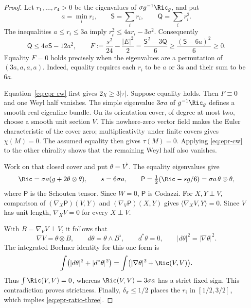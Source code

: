 \begin{proof}
Let $r_1,\ldots,r_4>0$ be the eigenvalues of
$\sigma g^{-1}\Ric_g$, and put
\[
 a=\min_i r_i,\qquad \mathsf S=\sum_i r_i,
 \qquad \mathsf Q=\sum_i r_i^2.
\]
The inequalities $a\leq r_i\leq3a$ imply
$r_i^2\leq4ar_i-3a^2$.  Consequently
\begin{equation}\label{eq:epr-density-endpoint}
 \mathsf Q\leq4a\mathsf S-12a^2,\qquad
 F:=\frac{s^2}{24}-\frac{|E|^2}{2}
 =\frac{\mathsf S^2-3\mathsf Q}{6}
 \geq\frac{(\mathsf S-6a)^2}{6}\geq0.
\end{equation}
Equality $F=0$ holds precisely when the eigenvalues are a permutation
of $(3a,a,a,a)$.  Indeed, equality requires each $r_i$ to be $a$ or
$3a$ and their sum to be $6a$.

Equation~\eqref{eq:epr-cw} first gives $2\chi\geq3|\tau|$.
Suppose equality holds.  Then $F\equiv0$ and one Weyl half vanishes.
The simple eigenvalue $3\sigma a$ of $g^{-1}\Ric_g$ defines a smooth
real eigenline bundle.  On its orientation cover, of degree at most
two, choose a smooth unit section $V$.  This nowhere-zero vector
field makes the Euler characteristic of the cover zero; multiplicativity
under finite covers gives $\chi(M)=0$.  The assumed equality then
gives $\tau(M)=0$.  Applying \eqref{eq:epr-cw} to the other chirality
shows that the remaining Weyl half also vanishes.

Work on that closed cover and put $\theta=V^\flat$.  The equality
eigenvalues give
\[
 \Ric=\sigma a(g+2\theta\otimes\theta),\qquad
 s=6\sigma a,
 \qquad
 \mathsf P=\tfrac12(\Ric-sg/6)
             =\sigma a\,\theta\otimes\theta,
\]
where $\mathsf P$ is the Schouten tensor.  Since $W=0$,
$\mathsf P$ is Codazzi.  For $X,Y\perp V$, comparison of
$(\nabla_X\mathsf P)(V,Y)$ and
$(\nabla_V\mathsf P)(X,Y)$ gives
$\langle\nabla_XV,Y\rangle=0$.  Since $V$ has unit length,
$\nabla_XV=0$ for every $X\perp V$.

With $B=\nabla_VV\perp V$, it follows that
\begin{equation}\label{eq:epr-eigenline}
 \nabla V=\theta\otimes B,\qquad
 d\theta=\theta\wedge B^\flat,\qquad
 d^*\theta=0,\qquad
 |d\theta|^2=|\nabla\theta|^2.
\end{equation}
The integrated Bochner identity for this one-form is
\[
 \int\bigl(|d\theta|^2+|d^*\theta|^2\bigr)
 =\int\bigl(|\nabla\theta|^2+\Ric(V,V)\bigr).
\]
Thus $\int\Ric(V,V)=0$, whereas $\Ric(V,V)=3\sigma a$ has a
strict fixed sign.  This contradiction proves strictness.  Finally,
$\delta_\sigma\leq1/2$ places the $r_i$ in $[1/2,3/2]$, which
implies \eqref{eq:epr-ratio-three}.
\end{proof}

